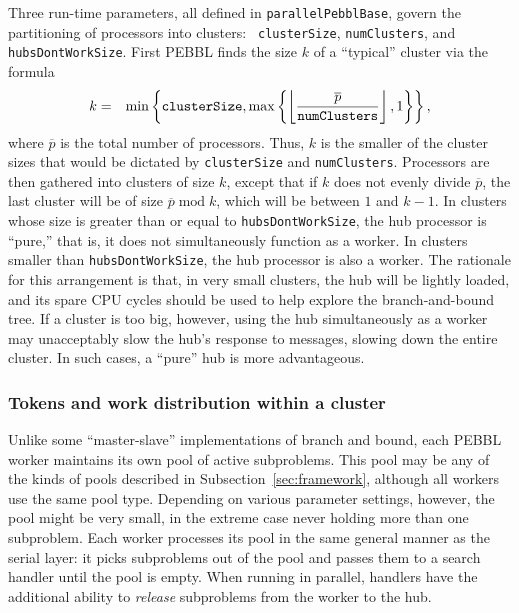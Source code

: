 Three run-time parameters, all defined in \texttt{parallelPebblBase},
govern the partitioning of processors into clusters: {\tt
clusterSize}, \texttt{numClusters}, and \texttt{hubsDontWorkSize}.  First
PEBBL finds the size $k$ of a ``typical'' cluster via the formula
\begin{eqnarray*}
k &= &
\min \left\{ 
\mbox{\tt clusterSize},
\max \left\{
\left\lfloor \frac{\overline{p}}{\mbox{\tt numClusters}}
\right\rfloor,
1
\right\}
\right\} ,
\end{eqnarray*}
where $\overline{p}$ is the total number of processors.  Thus, $k$ is
the smaller of the cluster sizes that would be dictated by
\texttt{clusterSize} and \texttt{numClusters}.  Processors are then
gathered into clusters of size $k$, except that if $k$ does not evenly
divide $\overline{p}$, the last cluster will be of size
$\overline{p}\; \mbox{mod}\;k$, which will be between $1$ and $k-1$.
In clusters whose size is greater than or equal to
\texttt{hubsDontWorkSize}, the hub processor is ``pure,'' that is, it
does not simultaneously function as a worker.  In clusters smaller
than \texttt{hubsDontWorkSize}, the hub processor is also a worker.
The rationale for this arrangement is that, in very small clusters,
the hub will be lightly loaded, and its spare CPU cycles should be
used to help explore the branch-and-bound tree.  If a cluster is too
big, however, using the hub simultaneously as a worker may
unacceptably slow the hub's response to messages, slowing down the
entire cluster.  In such cases, a ``pure'' hub is more advantageous.


\subsubsection{Tokens and work distribution within a cluster}
\label{sec:withincluster}
Unlike some ``master-slave'' implementations of branch and bound, each
PEBBL worker maintains its own pool of active subproblems.  This pool
may be any of the kinds of pools described in
Subsection~\ref{sec:framework}, although all workers use the same pool
type.  Depending on various parameter settings, however,
the pool might be very small, in the extreme case never holding more
than one subproblem.  Each worker processes its pool in the same
general manner as the serial layer: it picks subproblems out of the
pool and passes them to a search handler until the pool is empty.
When running in parallel, handlers have the additional ability to
\emph{release} subproblems from the worker to the hub.

